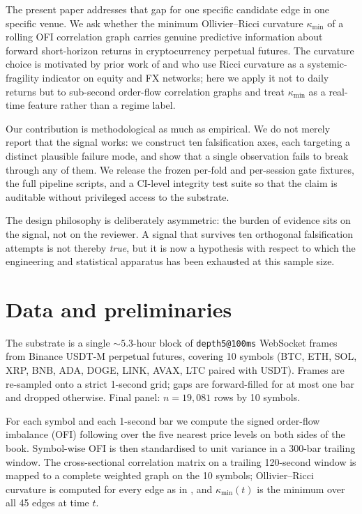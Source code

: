\documentclass[11pt,a4paper]{article}
\begin{document}
The present paper addresses that gap for one specific candidate edge in one
specific venue. We ask whether the minimum Ollivier--Ricci curvature
$\kappa_{\min}$ of a rolling OFI correlation graph carries genuine
predictive information about forward short-horizon returns in cryptocurrency
perpetual futures. The curvature choice is motivated by prior work of
\citet{sandhu2016marketfragility} and \citet{bai2020networkricci} who use
Ricci curvature as a systemic-fragility indicator on equity and FX networks;
here we apply it not to daily returns but to sub-second order-flow
correlation graphs and treat $\kappa_{\min}$ as a real-time feature rather
than a regime label.

Our contribution is methodological as much as empirical. We do not merely
report that the signal works: we construct ten falsification axes, each
targeting a distinct plausible failure mode, and show that a single
observation fails to break through any of them. We release the frozen
per-fold and per-session gate fixtures, the full pipeline scripts, and a
CI-level integrity test suite so that the claim is auditable without
privileged access to the substrate.

The design philosophy is deliberately asymmetric: the burden of evidence
sits on the signal, not on the reviewer. A signal that survives ten
orthogonal falsification attempts is not thereby \emph{true}, but it is now
a hypothesis with respect to which the engineering and statistical
apparatus has been exhausted at this sample size.

\section{Data and preliminaries}
\label{sec:data}

The substrate is a single $\sim\!5.3$-hour block of
\texttt{depth5@100ms} WebSocket frames from Binance USDT-M perpetual
futures, covering 10 symbols (BTC, ETH, SOL, XRP, BNB, ADA, DOGE, LINK,
AVAX, LTC paired with USDT). Frames are re-sampled onto a strict 1-second
grid; gaps are forward-filled for at most one bar and dropped otherwise.
Final panel: $n = 19{,}081$ rows by 10 symbols.

For each symbol and each 1-second bar we compute the signed order-flow
imbalance (OFI) following \citet{cont2014ofi} over the five nearest price
levels on both sides of the book. Symbol-wise OFI is then standardised to
unit variance in a 300-bar trailing window. The cross-sectional
correlation matrix on a trailing 120-second window is mapped to a complete
weighted graph on the 10 symbols; Ollivier--Ricci curvature is computed
for every edge as in \citet{ollivier2009ricci}, and $\kappa_{\min}(t)$ is
the minimum over all 45 edges at time $t$.
\end{document}
